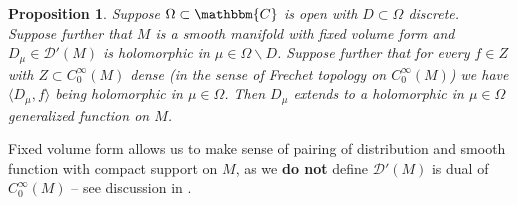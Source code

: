 \documentclass{article}
\newcommand{\tmtextbf}[1]{{\bfseries{#1}}}
\newtheorem{proposition}{Proposition}
{\theorembodyfont{\rmfamily}\newtheorem{remark}{Remark}}
\begin{document}
\begin{proposition}
  \label{k-finite:prop-kfinite-extension-oneparam}Suppose $\Omega \subset
  \mathbbm{C}$ is open with $D \subset \Omega$ discrete. Suppose further that
  $M$ is a smooth manifold with fixed volume form and $D_{\mu} \in
  \mathcal{D}' (M)$ is holomorphic in $\mu \in \Omega \backslash D$. Suppose
  further that for every $f \in Z$ with $Z \subset C^{\infty}_0 (M)$ dense (in
  the sense of Frechet topology on $C_0^{\infty} (M)$) we have $\langle
  D_{\mu}, f \rangle$ being holomorphic in $\mu \in \Omega$. Then $D_{\mu}$
  extends to a holomorphic in $\mu \in \Omega$ generalized function on $M$. 
\end{proposition}

\begin{remark}
  Fixed volume form allows us to make sense of pairing of distribution and
  smooth function with compact support on $M$, as we \tmtextbf{do not} define
  $\mathcal{D}' (M)$ is dual of $C_0^{\infty} (M)$ -- see discussion in
  {\cite[sec 6.3]{hormander1983analysis}}.
\end{remark}
\end{document}
